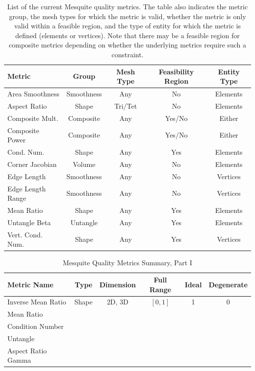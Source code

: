 \begin{table}[htb]
\begin{center}
\begin{tabular}{|l|c|c|c|c|}
\hline
Metric & Group & Mesh Type & Feasibility Region &Entity Type\\
\hline
Area Smoothness &Smoothness & Any & No & Elements\\
Aspect Ratio & Shape &Tri/Tet & No & Elements\\
Composite Mult. & Composite &Any& Yes/No & Either\\
Composite Power & Composite &Any& Yes/No & Either\\
Cond. Num.& Shape & Any & Yes & Elements \\
Corner Jacobian & Volume & Any & No & Elements \\
Edge Length &Smoothness & Any & No & Vertices \\
Edge Length Range & Smoothness & Any &No & Vertices\\
Mean Ratio &Shape & Any & Yes &Elements\\
Untangle Beta &Untangle &Any&Yes&Elements\\
Vert. Cond. Num.& Shape & Any & Yes & Vertices\\
\hline
\end{tabular}
\label{current-metrics}
\caption{List of the current Mesquite quality metrics. The table also
indicates the metric group, the mesh types for which the metric is
valid, whether the metric is only valid within a feasible
region, and the type of entity for which the metric is defined (elements
or vertices).  Note that there may be a feasible region for composite
metrics depending on whether the underlying metrics require such a
constraint.}
\end{center}
\end{table}


\begin{table}[h]
\begin{center}
\begin{tabular}{|l|c|c|c|c|c|}
\hline
Metric Name & Type & Dimension & Full Range & Ideal & Degenerate \\ \hline
Inverse Mean Ratio & Shape & 2D, 3D & $[0,1]$ & 1 & 0 \\ 
Mean Ratio &  &  &  &  &  \\ 
Condition Number &  &  &  &  &  \\ 
Untangle &  &  &  &  &  \\ 
Aspect Ratio Gamma &  &  &  &  &  \\ 
\hline
\end{tabular}
\caption{\label{QualityMetrics1} Mesquite Quality Metrics Summary, Part I}
\end{center}
\end{table}

